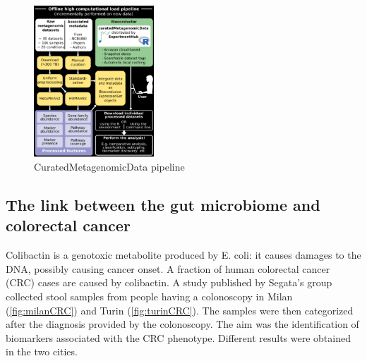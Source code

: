     \begin{figure}[!h]
    \centering
    \includegraphics[width=0.4\textwidth]{curatedMetagenomicData.png}
    \caption{\label{fig:curatedMetagenomicData}CuratedMetagenomicData pipeline}
    \end{figure}

    \subsection{The link between the gut microbiome and colorectal cancer}
    Colibactin is a genotoxic metabolite produced by E. coli: it causes damages to the DNA, possibly causing cancer onset.
    A fraction of human colorectal cancer (CRC) cases are caused by colibactin.
    A study published by Segata’s group collected stool samples from people having a colonoscopy in Milan (\ref{fig:milanCRC}) and Turin (\ref{fig:turinCRC}).
    The samples were then categorized after the diagnosis provided by the colonoscopy.
    The aim was the identification of biomarkers associated with the CRC phenotype.
    Different results were obtained in the two cities.

